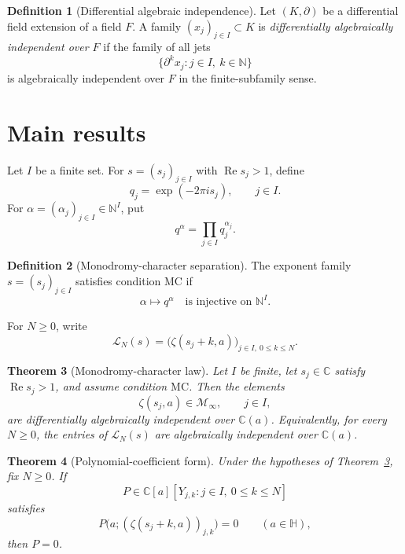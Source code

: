 \documentclass[11pt,reqno]{amsart}
\newtheorem{theorem}{Theorem}[section]
\theoremstyle{definition}
\newtheorem{definition}[theorem]{Definition}
\theoremstyle{remark}
\newcommand{\C}{\mathbb C}
\newcommand{\N}{\mathbb N}
\newcommand{\HH}{\mathbb H}
\newcommand{\Minf}{\mathcal M_{\infty}}
\newcommand{\mc}{\mathrm{MC}}
\begin{document}
\begin{definition}[Differential algebraic independence]
Let $(K,\partial)$ be a differential field extension of a field $F$.  A
family $(x_j)_{j\in I}\subset K$ is \emph{differentially algebraically
independent over $F$} if the family of all jets
\[
  \{\partial^k x_j:j\in I,\ k\in\N\}
\]
is algebraically independent over $F$ in the finite-subfamily sense.
\end{definition}

\section{Main results}\label{sec:statements}

Let $I$ be a finite set.  For $s=(s_j)_{j\in I}$ with
$\operatorname{Re}s_j>1$, define
\begin{equation}\label{eq:monodromy-vector}
  q_j=\exp(-2\pi i s_j),\qquad j\in I.
\end{equation}
For $\alpha=(\alpha_j)_{j\in I}\in\N^I$, put
\[
  q^\alpha=\prod_{j\in I}q_j^{\alpha_j}.
\]

\begin{definition}[Monodromy-character separation]\label{def:MC}
The exponent family $s=(s_j)_{j\in I}$ satisfies condition $\mc$ if
\begin{equation}\label{eq:MC}
  \alpha\longmapsto q^\alpha
  \quad\text{is injective on }\N^I.
\end{equation}
\end{definition}

For $N\geq0$, write
\begin{equation}\label{eq:ladder}
  \mathcal L_N(s)=
  \bigl(\zeta(s_j+k,a)\bigr)_{j\in I,\ 0\leq k\leq N}.
\end{equation}

\begin{theorem}[Monodromy-character law]\label{thm:main}
Let $I$ be finite, let $s_j\in\C$ satisfy
$\operatorname{Re}s_j>1$, and assume condition $\mc$.  Then the elements
\[
  \zeta(s_j,a)\in\Minf,\qquad j\in I,
\]
are differentially algebraically independent over $\C(a)$.  Equivalently,
for every $N\geq0$, the entries of $\mathcal L_N(s)$ are algebraically
independent over $\C(a)$.
\end{theorem}

\begin{theorem}[Polynomial-coefficient form]\label{thm:polynomial}
Under the hypotheses of Theorem~\ref{thm:main}, fix $N\geq0$.  If
\[
  P\in\C[a][Y_{j,k}:j\in I,\ 0\leq k\leq N]
\]
satisfies
\begin{equation}\label{eq:polynomial-relation}
  P\bigl(a;(\zeta(s_j+k,a))_{j,k}\bigr)=0
  \qquad(a\in\HH),
\end{equation}
then $P=0$.
\end{theorem}
\end{document}
